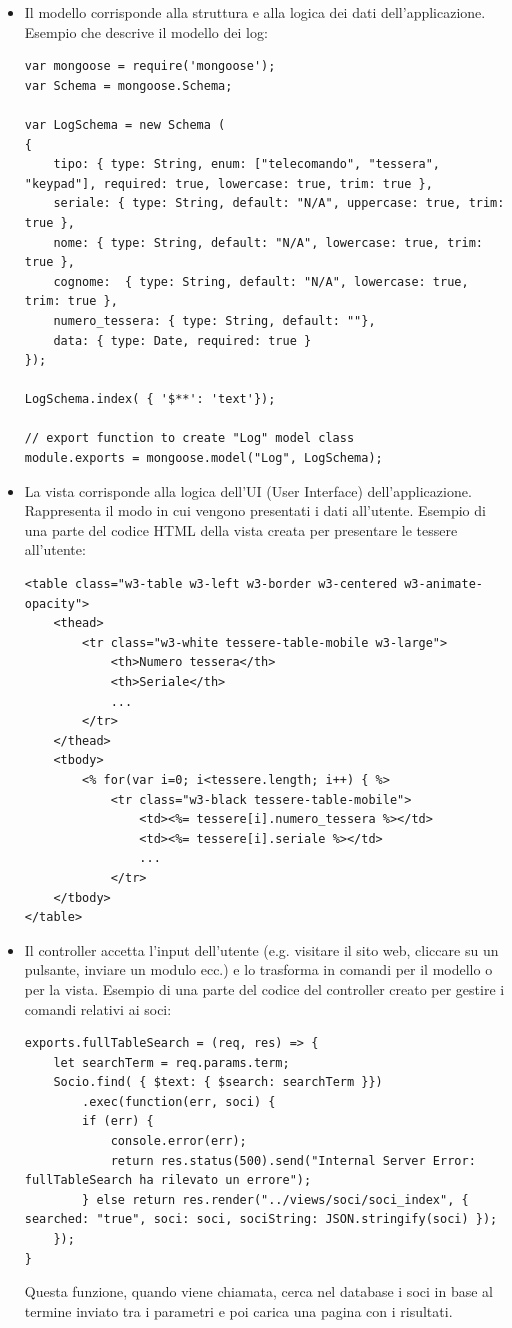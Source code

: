 \documentclass[12pt]{report}
\begin{document}
\begin{itemize}
	\item Il modello corrisponde alla struttura e alla logica dei dati dell'applicazione. Esempio che descrive il modello dei log:
\begin{lstlisting}
var mongoose = require('mongoose');
var Schema = mongoose.Schema;

var LogSchema = new Schema (
{
	tipo: { type: String, enum: ["telecomando", "tessera", "keypad"], required: true, lowercase: true, trim: true },
	seriale: { type: String, default: "N/A", uppercase: true, trim: true },
	nome: { type: String, default: "N/A", lowercase: true, trim: true },
	cognome:  { type: String, default: "N/A", lowercase: true, trim: true },
	numero_tessera: { type: String, default: ""},
	data: { type: Date, required: true }
});

LogSchema.index( { '$**': 'text'});

// export function to create "Log" model class
module.exports = mongoose.model("Log", LogSchema);
\end{lstlisting}
	\item La vista corrisponde alla logica dell'UI (User Interface) dell'applicazione. Rappresenta il modo in cui vengono presentati i dati all'utente. Esempio di una parte del codice HTML della vista creata per presentare le tessere all'utente:
\begin{lstlisting}
<table class="w3-table w3-left w3-border w3-centered w3-animate-opacity">
	<thead>
		<tr class="w3-white tessere-table-mobile w3-large">
			<th>Numero tessera</th>
			<th>Seriale</th>
			...
		</tr>
	</thead>
	<tbody>
		<% for(var i=0; i<tessere.length; i++) { %>
			<tr class="w3-black tessere-table-mobile">
				<td><%= tessere[i].numero_tessera %></td>
				<td><%= tessere[i].seriale %></td>
				...
			</tr>
	</tbody>
</table>
\end{lstlisting}
	\item Il controller accetta l'input dell'utente (e.g. visitare il sito web, cliccare su un pulsante, inviare un modulo ecc.) e lo trasforma in comandi per il modello o per la vista. Esempio di una parte del codice del controller creato per gestire i comandi relativi ai soci:
\begin{lstlisting}
exports.fullTableSearch = (req, res) => {
	let searchTerm = req.params.term;
	Socio.find( { $text: { $search: searchTerm }})
		.exec(function(err, soci) {
		if (err) {
			console.error(err);
			return res.status(500).send("Internal Server Error: fullTableSearch ha rilevato un errore");
		} else return res.render("../views/soci/soci_index", { searched: "true", soci: soci, sociString: JSON.stringify(soci) });
	});
}
\end{lstlisting}
	 Questa funzione, quando viene chiamata, cerca nel database i soci in base al termine inviato tra i parametri e poi carica una pagina con i risultati.
\end{itemize}
\end{document}
